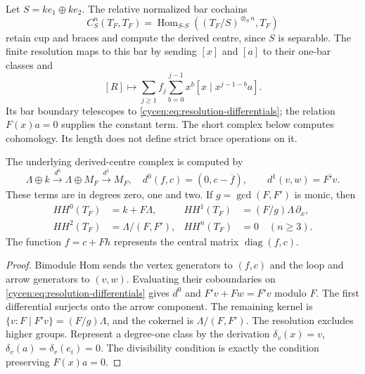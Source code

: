 Let $S=ke_1\oplus ke_2$. The relative normalized bar cochains
\[
 C_S^n(T_F,T_F)=\operatorname{Hom}_{S\text{-}S}
       ((T_F/S)^{\otimes_S n},T_F)
\]
retain cup and braces and compute the derived centre, since
$S$ is separable. The finite resolution maps to this bar by
sending $[x]$ and $[a]$ to their one-bar classes and
\begin{equation}\label{cycen:eq:relation-bar}
 [R]\longmapsto
 \sum_{j\geq1}f_j\sum_{b=0}^{j-1}x^b[x\mid x^{j-1-b}a].
\end{equation}
Its bar boundary telescopes to
\eqref{cycen:eq:resolution-differentials}; the relation
$F(x)a=0$ supplies the constant term. The short complex
below computes cohomology. Its length does not define strict
brace operations on it.

\begin{theorem}\label{cycen:thm:attached-centre}
The underlying derived-centre complex is computed by
\begin{equation}\label{cycen:eq:small}
 \Lambda\oplus k\xrightarrow{d^0}\Lambda\oplus M_F
 \xrightarrow{d^1}M_F,
 \quad
 d^0(f,c)=(0,c-\overline f),\qquad
 d^1(v,w)=\overline{F'v}.
\end{equation}
These terms are in degrees zero, one and two. If
$g=\gcd(F,F')$ is monic, then
\begin{equation}\label{cycen:eq:attached-hh}
 \begin{aligned}
 HH^0(T_F)&=k+F\Lambda,&
 HH^1(T_F)&=(F/g)\Lambda\,\partial_x,\\
 HH^2(T_F)&=\Lambda/(F,F'),& HH^{n}(T_F)&=0\quad(n\geq3).
 \end{aligned}
\end{equation}
The function $f=c+Fh$ represents the central matrix
$\operatorname{diag}(f,c)$.
\end{theorem}
\begin{proof}
Bimodule Hom sends the vertex generators to $(f,c)$ and
the loop and arrow generators to $(v,w)$. Evaluating their
coboundaries on \eqref{cycen:eq:resolution-differentials}
gives $d^0$ and $F'v+Fw=F'v$ modulo $F$. The first
differential surjects onto the arrow component. The remaining
kernel is $\{v:F\mid F'v\}=(F/g)\Lambda$, and the cokernel
is $\Lambda/(F,F')$. The resolution excludes higher groups.
Represent a degree-one class by the derivation
$\delta_v(x)=v$, $\delta_v(a)=\delta_v(e_i)=0$.
The divisibility condition is exactly the condition preserving
$F(x)a=0$.
\end{proof}

